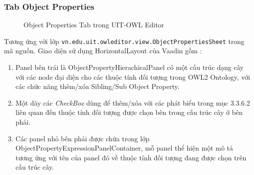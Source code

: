 \subsubsection{Tab Object Properties}  
\begin{figure}[h!]
	\centering
	\caption{Object Properties Tab trong UIT-OWL Editor\label{overflow}}
\end{figure}
Tương ứng với lớp \verb|vn.edu.uit.owleditor.view.ObjectPropertiesSheet| trong mã nguồn. Giao diện sử dụng HorizontalLayout của Vaadin gồm :
\begin{enumerate}
\item Panel bên trái là ObjectPropertyHierachicalPanel có một cấu trúc dạng cây với các node đại diện cho các thuộc tính đối tượng trong OWL2 Ontology, với các chức năng thêm/xóa Sibling/Sub Object Property.
\item Một dãy các \textit{CheckBox} dùng để thêm/xóa với các phát biểu trong mục 3.3.6.2 liên quan đến thuộc tính đối tượng được chọn bên trong cấu trúc cây ở bên phải.
\item Các panel nhỏ bên phải được chứa trong lớp ObjectPropertyExpressionPanelContainer, mỗ panel thể hiện một mô tả tương ứng với tên của panel đó về thuộc tính đối tượng đang được chọn trên cấu trúc cây.
\end{enumerate}	


